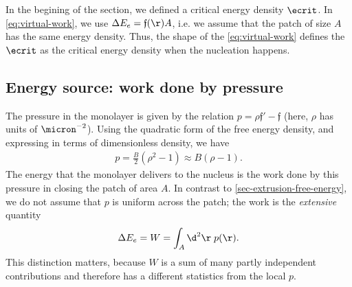 In the begining of the section, we defined a critical energy density $\ecrit$. In \cref{eq:virtual-work}, we use $\Delta E_e = \mathfrak{f}(\r) A$, i.e. we assume that the patch of size $A$ has the same energy density. Thus, the shape of the \cref{eq:virtual-work} defines the $\ecrit$ as the critical energy density when the nucleation happens.



\subsection{Energy source: work done by pressure}
\label{sec-extrusion-work}

The pressure in the monolayer is given by the relation $p=\rho \mathfrak{f}'-\mathfrak{f}$ (here, $\rho$ has units of $\micron^{-2}$). Using the quadratic form of the free energy density, and expressing in terms of dimensionless density, we have
\begin{align}
    \label{eq:pressure-of-rho}
    p = \frac{B}{2} (\rho^2 - 1) \approx B (\rho-1).
\end{align}
The energy that the monolayer delivers to the nucleus is the work done by this pressure in closing the patch of area $A$. In contrast to \cref{sec-extrusion-free-energy}, we do not assume that $p$ is uniform across the patch; the work is the \emph{extensive} quantity
\begin{align}
    \label{eq:work-extensive}
    \Delta E_e = W = \int_A \d^2\r\; p(\r) .
\end{align}
This distinction matters, because $W$ is a sum of many partly independent contributions and therefore has a different statistics from the local $p$.

